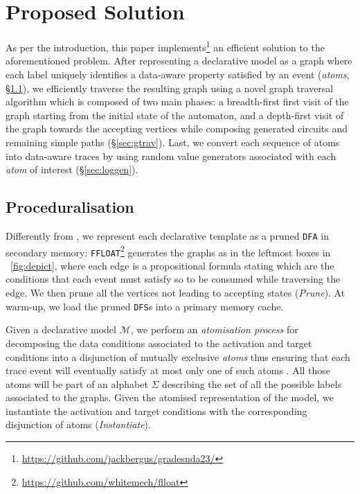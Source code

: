 \documentclass[sigconf]{acmart}
\begin{document}
\section{Proposed Solution}\label{sec:algo}
As per the introduction, this paper implements\footnote{\url{https://github.com/jackbergus/gradesnda23/}}  an efficient solution to the aforementioned problem. After representing a declarative model as a graph where each label uniquely identifies a data-aware property satisfied by an event (\textit{atoms}, \S\ref{sec:ODFAgen}), we efficiently traverse the resulting graph using a novel graph traversal algorithm which is composed of two main phases: a breadth-first first visit of the graph starting from the initial state of the automaton, and a depth-first visit of the graph towards the accepting vertices while composing generated circuits and remaining simple paths (\S\ref{sec:gtrav}). Last, we convert each sequence of atoms into data-aware traces by using random value generators associated with each \textit{atom} of interest (\S\ref{sec:loggen}).




\subsection{Proceduralisation}\label{sec:ODFAgen}
Differently from \cite{DBLP:conf/caise/CiccioBCM15}, we represent each declarative template  as a pruned \texttt{DFA} in secondary memory: \texttt{FFLOAT}\footnote{\url{https://github.com/whitemech/flloat}} \cite{FLLOAT1}  generates the graphs as in the leftmost boxes in \figurename~\ref{fig:depict}, where each edge is a propositional formula stating which are the conditions that each event must satisfy so to be consumed while traversing the edge. We then prune all the vertices not leading to accepting states (\textit{Prune}). At warm-up, we load the pruned \texttt{DFS}s into a primary memory cache. 

Given a declarative model $\mathcal{M}$, %
we %
perform an \textit{atomisation process} for %
decomposing the data conditions associated to the activation and target conditions into a disjunction of mutually exclusive \textit{atoms} thus ensuring that each trace event will eventually satisfy at most only one of such atoms  \cite{DBLP:conf/bpm/BergamiMMM21}. All those atoms will be part of an alphabet $\Sigma$ describing the set of all the possible labels associated to the graphs. %
Given the atomised representation of the model, we  instantiate the activation and target conditions with the corresponding disjunction of atoms %
(\textit{Instantiate}). 
\end{document}
